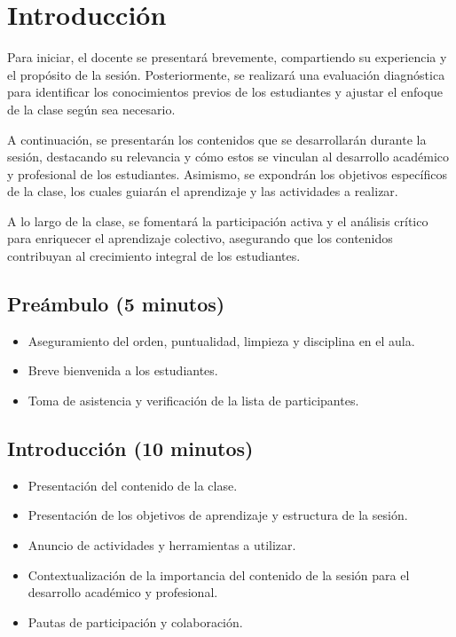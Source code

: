 \section{Introducción}

Para iniciar, el docente se presentará brevemente, compartiendo su experiencia y el propósito de la sesión. Posteriormente, se realizará una evaluación diagnóstica para identificar los conocimientos previos de los estudiantes y ajustar el enfoque de la clase según sea necesario.

A continuación, se presentarán los contenidos que se desarrollarán durante la sesión, destacando su relevancia y cómo estos se vinculan al desarrollo académico y profesional de los estudiantes. Asimismo, se expondrán los objetivos específicos de la clase, los cuales guiarán el aprendizaje y las actividades a realizar.

A lo largo de la clase, se fomentará la participación activa y el análisis crítico para enriquecer el aprendizaje colectivo, asegurando que los contenidos contribuyan al crecimiento integral de los estudiantes.

\subsection*{Preámbulo (5 minutos)}
\begin{itemize}
    \item Aseguramiento del orden, puntualidad, limpieza y disciplina en el aula.
    \item Breve bienvenida a los estudiantes.
    \item Toma de asistencia y verificación de la lista de participantes.
\end{itemize}

\subsection*{Introducción (10 minutos)}
\begin{itemize}
    \item Presentación del contenido de la clase.
    \item Presentación de los objetivos de aprendizaje y estructura de la sesión.
    \item Anuncio de actividades y herramientas a utilizar.
    \item Contextualización de la importancia del contenido de la sesión para el desarrollo académico y profesional.
    \item Pautas de participación y colaboración.
\end{itemize}

